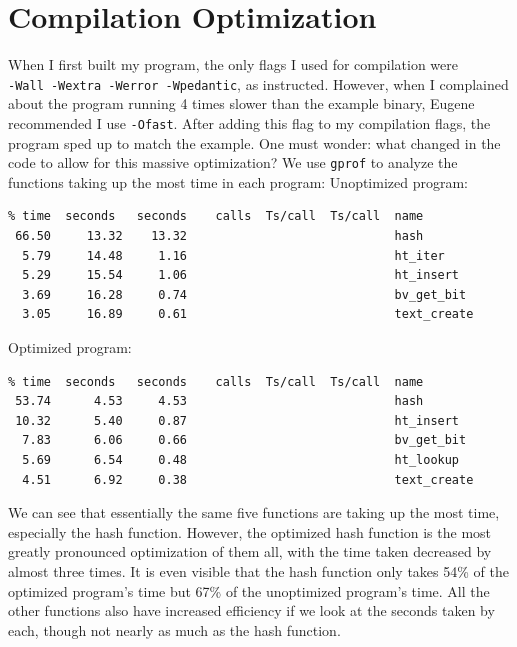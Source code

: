 \documentclass[12pt]{article}
\begin{document}
\section{Compilation Optimization}
When I first built my program, the only flags I used for compilation were\\\verb|-Wall -Wextra -Werror -Wpedantic|, as instructed. However, when I complained about the program running 4 times slower than the example binary, Eugene recommended I use \verb|-Ofast|. After adding this flag to my compilation flags, the program sped up to match the example. One must wonder: what changed in the code to allow for this massive optimization? We use \verb|gprof| to analyze the functions taking up the most time in each program:
\newpage
Unoptimized program:
\begin{verbatim}
% time  seconds   seconds    calls  Ts/call  Ts/call  name    
 66.50     13.32    13.32                             hash
  5.79     14.48     1.16                             ht_iter
  5.29     15.54     1.06                             ht_insert
  3.69     16.28     0.74                             bv_get_bit
  3.05     16.89     0.61                             text_create
\end{verbatim}
Optimized program:
\begin{verbatim}
% time  seconds   seconds    calls  Ts/call  Ts/call  name    
 53.74      4.53     4.53                             hash
 10.32      5.40     0.87                             ht_insert
  7.83      6.06     0.66                             bv_get_bit
  5.69      6.54     0.48                             ht_lookup
  4.51      6.92     0.38                             text_create
\end{verbatim}
We can see that essentially the same five functions are taking up the most time, especially the hash function. However, the optimized hash function is the most greatly pronounced optimization of them all, with the time taken decreased by almost three times. It is even visible that the hash function only takes 54\% of the optimized program's time but 67\% of the unoptimized program's time. All the other functions also have increased efficiency if we look at the seconds taken by each, though not nearly as much as the hash function.
\end{document}
